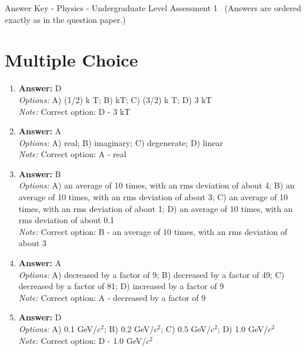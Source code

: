 \documentclass[12pt]{article}
\begin{document}
\begin{center}
Answer Key - Physics - Undergraduate Level Assessment 1 \
\small (Answers are ordered exactly as in the question paper.)
\end{center}

\section*{Multiple Choice}
\begin{enumerate}[label=\arabic*.]
\item \textbf{Answer:} D
\\ \textit{Options:} A) (1/2) k T; B) kT; C) (3/2) k T; D) 3 kT
\\ \textit{Note:} Correct option: D - 3 kT
\item \textbf{Answer:} A
\\ \textit{Options:} A) real; B) imaginary; C) degenerate; D) linear
\\ \textit{Note:} Correct option: A - real
\item \textbf{Answer:} B
\\ \textit{Options:} A) an average of 10 times, with an rms deviation of about 4; B) an average of 10 times, with an rms deviation of about 3; C) an average of 10 times, with an rms deviation of about 1; D) an average of 10 times, with an rms deviation of about 0.1
\\ \textit{Note:} Correct option: B - an average of 10 times, with an rms deviation of about 3
\item \textbf{Answer:} A
\\ \textit{Options:} A) decreased by a factor of 9; B) decreased by a factor of 49; C) decreased by a factor of 81; D) increased by a factor of 9
\\ \textit{Note:} Correct option: A - decreased by a factor of 9
\item \textbf{Answer:} D
\\ \textit{Options:} A) 0.1 GeV/$c^2$; B) 0.2 GeV/$c^2$; C) 0.5 GeV/$c^2$; D) 1.0 GeV/$c^2$
\\ \textit{Note:} Correct option: D - 1.0 GeV/$c^2$
\end{enumerate}
\end{document}
